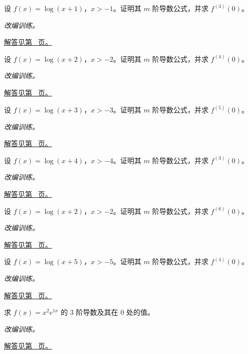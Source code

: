 \documentclass[12pt,fontset=fandol]{ctexart}
\begin{document}
\begin{example}[对数的高阶导数]\label{ex:c9q13}
设 $f(x)=\log(x+1)$，$x>-1$。证明其 $m$ 阶导数公式，并求 $f^{(3)}(0)$。
\par\textit{改编训练。}\par\hyperref[ans:c9q13]{解答见第~\pageref{ans:c9q13} 页。}
\end{example}
\begin{example}[对数的高阶导数]\label{ex:c9q14}
设 $f(x)=\log(x+2)$，$x>-2$。证明其 $m$ 阶导数公式，并求 $f^{(4)}(0)$。
\par\textit{改编训练。}\par\hyperref[ans:c9q14]{解答见第~\pageref{ans:c9q14} 页。}
\end{example}
\begin{example}[对数的高阶导数]\label{ex:c9q15}
设 $f(x)=\log(x+3)$，$x>-3$。证明其 $m$ 阶导数公式，并求 $f^{(5)}(0)$。
\par\textit{改编训练。}\par\hyperref[ans:c9q15]{解答见第~\pageref{ans:c9q15} 页。}
\end{example}
\begin{example}[对数的高阶导数]\label{ex:c9q16}
设 $f(x)=\log(x+4)$，$x>-4$。证明其 $m$ 阶导数公式，并求 $f^{(3)}(0)$。
\par\textit{改编训练。}\par\hyperref[ans:c9q16]{解答见第~\pageref{ans:c9q16} 页。}
\end{example}
\begin{example}[对数的高阶导数]\label{ex:c9q17}
设 $f(x)=\log(x+2)$，$x>-2$。证明其 $m$ 阶导数公式，并求 $f^{(6)}(0)$。
\par\textit{改编训练。}\par\hyperref[ans:c9q17]{解答见第~\pageref{ans:c9q17} 页。}
\end{example}
\begin{example}[对数的高阶导数]\label{ex:c9q18}
设 $f(x)=\log(x+5)$，$x>-5$。证明其 $m$ 阶导数公式，并求 $f^{(4)}(0)$。
\par\textit{改编训练。}\par\hyperref[ans:c9q18]{解答见第~\pageref{ans:c9q18} 页。}
\end{example}
\begin{example}\label{ex:c9q19}
求 $f(x)=x^2e^{1x}$ 的 $3$ 阶导数及其在 $0$ 处的值。
\par\textit{改编训练。}\par\hyperref[ans:c9q19]{解答见第~\pageref{ans:c9q19} 页。}
\end{example}
\end{document}
